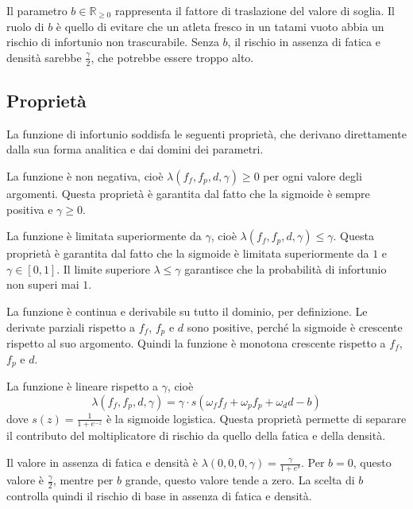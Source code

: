 Il parametro $b \in \mathbb{R}_{\geq 0}$ rappresenta il fattore di traslazione del valore di soglia. Il ruolo di $b$ è quello di evitare che un atleta fresco in un tatami vuoto abbia un rischio di infortunio non trascurabile. Senza $b$, il rischio in assenza di fatica e densità sarebbe $\frac{\gamma}{2}$, che potrebbe essere troppo alto.

\subsection{Proprietà}

La funzione di infortunio soddisfa le seguenti proprietà, che derivano direttamente dalla sua forma analitica e dai domini dei parametri. \par

La funzione è non negativa, cioè $\lambda(f_f, f_p, d, \gamma) \geq 0$ per ogni valore degli argomenti. Questa proprietà è garantita dal fatto che la sigmoide è sempre positiva e $\gamma \geq 0$. \par

La funzione è limitata superiormente da $\gamma$, cioè $\lambda(f_f, f_p, d, \gamma) \leq \gamma$. Questa proprietà è garantita dal fatto che la sigmoide è limitata superiormente da $1$ e $\gamma \in [0, 1]$. Il limite superiore $\lambda \leq \gamma$ garantisce che la probabilità di infortunio non superi mai $1$. \par

La funzione è continua e derivabile su tutto il dominio, per definizione. Le derivate parziali rispetto a $f_f$, $f_p$ e $d$ sono positive, perché la sigmoide è crescente rispetto al suo argomento. Quindi la funzione è monotona crescente rispetto a $f_f$, $f_p$ e $d$. \par

La funzione è lineare rispetto a $\gamma$, cioè
\[
    \lambda(f_f, f_p, d, \gamma) = \gamma \cdot s\left(\omega_f f_f + \omega_p f_p + \omega_d d - b\right)
\]
dove $s(z) = \frac{1}{1 + e^{-z}}$ è la sigmoide logistica. Questa proprietà permette di separare il contributo del moltiplicatore di rischio da quello della fatica e della densità. \par

Il valore in assenza di fatica e densità è $\lambda(0, 0, 0, \gamma) = \frac{\gamma}{1 + e^b}$. Per $b = 0$, questo valore è $\frac{\gamma}{2}$, mentre per $b$ grande, questo valore tende a zero. La scelta di $b$ controlla quindi il rischio di base in assenza di fatica e densità. \par

